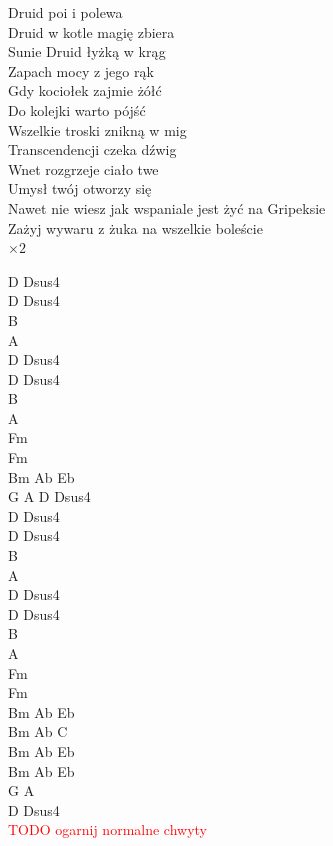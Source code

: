 \documentclass[a5paper, 10pt]{book}
\begin{document}
\begin{minipage}[t]{0.85\textwidth}
  Druid poi i polewa                   \\
  Druid w kotle magię zbiera\\
  Sunie Druid łyżką w krąg    \\
  Zapach mocy z jego rąk     \\
  Gdy kociołek zajmie żółć       \\
  Do kolejki warto pójść\\
  Wszelkie troski znikną w mig     \\
  Transcendencji czeka dźwig    \\
  \hspace*{3mm}Wnet rozgrzeje ciało twe          \\
  \hspace*{3mm}Umysł twój otworzy się\\

  Nawet nie wiesz jak wspaniale jest żyć na Gripeksie\\
  Zażyj wywaru z żuka na wszelkie boleście               \\
  \hspace*{2cm}$\times 2$\\
\end{minipage}
\begin{minipage}[t]{0.15\textwidth}
  D Dsus4\\
  D Dsus4\\
  B\\
  A\\
  D Dsus4\\
  D Dsus4\\
  B\\
  A\\

  Fm\\
  Fm\\

  Bm Ab Eb\\
  G A D Dsus4\\
  D Dsus4\\
  D Dsus4\\
  B\\
  A\\
  D Dsus4\\
  D Dsus4\\
  B\\
  A\\

  Fm\\
  Fm\\

  Bm Ab Eb\\
  Bm Ab C\\
  Bm Ab Eb\\
  Bm Ab Eb\\
  G A\\
  D Dsus4\\

  \textcolor{red}{TODO ogarnij normalne chwyty}\\
\end{minipage}
\end{document}
